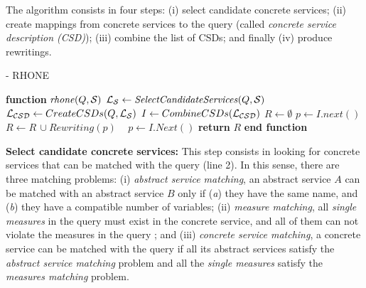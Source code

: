 The algorithm consists in four steps: (i) select candidate concrete services; (ii)
create mappings from concrete services to the query (called \textit{concrete
service description (CSD)}); (iii) combine the list of CSDs; and finally (iv)
produce rewritings.


\begin{algorithm}
\small
\caption{ - RHONE}
\label{algo-rhone}
\begin{algorithmic}[1]
\STATE \textbf{function} $\mathit{rhone} (Q, \bigS)$
 \STATE  $\bigLS \leftarrow \mathit{SelectCandidateServices}(Q, \bigS)$ \label{rhone:buildPCD}
 \STATE  $\bigLCSD \leftarrow CreateCSDs(Q, \bigLS)$
 \STATE  $I \leftarrow CombineCSDs(\bigLCSD)$
 \STATE $R\leftarrow \emptyset$
    \STATE $p \leftarrow I.next()$
  \STATE $R\leftarrow R\,\cup \mathit{Rewriting}(p)$
  \STATE ~\!
   \ENDIF
      \STATE $p \leftarrow I.\mathit{Next}()$
 \ENDWHILE
    \STATE \textbf{return} $R$
\STATE \textbf{end function}
\end{algorithmic}
\end{algorithm}

\noindent \textbf{Select candidate concrete services:} This step consists in
 looking for concrete services that can be matched with the query (line 2). In
 this sense, there are three matching problems: 
 (i) \textit{abstract service matching}, an abstract service $A$ can be
 matched with an abstract service $B$ only if (\textit{a}) they have the same
 name, and (\textit{b}) they have a compatible number of variables;
 (ii) \textit{measure matching}, all \textit{single measures} in the query must
 exist in the concrete service, and all of them can not violate the measures in
 the query ; and 
 (iii) \textit{concrete service matching}, a concrete service can
 be matched with the query if all its abstract services satisfy the \textit{abstract service
 matching} problem and all the \textit{single measures} satisfy the \textit{measures matching} problem.
 

